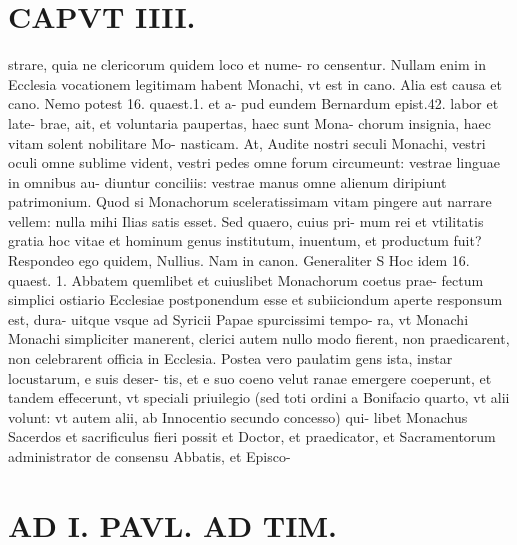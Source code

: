 \documentclass{article}
\begin{document}
\begin{pages}
\section*{CAPVT  IIII. }
\marginpar{[ p.223 ]}\pstart strare, quia ne clericorum quidem loco et nume- ro censentur. Nullam enim in Ecclesia vocationem legitimam habent Monachi, vt est in cano. Alia est causa et cano. Nemo potest 16. quaest.1. et a- pud eundem Bernardum epist.42. labor et late- brae, ait, et voluntaria paupertas, haec sunt Mona- chorum insignia, haec vitam solent nobilitare Mo- nasticam. At, Audite nostri seculi Monachi, vestri oculi omne sublime vident, vestri pedes omne forum circumeunt: vestrae linguae in omnibus au- diuntur conciliis: vestrae manus omne alienum diripiunt patrimonium. Quod si Monachorum sceleratissimam vitam pingere aut narrare vellem: nulla mihi Ilias satis esset. Sed quaero, cuius pri- mum rei et vtilitatis gratia hoc vitae et hominum genus institutum, inuentum, et productum fuit? Respondeo ego quidem, Nullius. Nam in canon. Generaliter S Hoc idem 16. quaest. 1. Abbatem quemlibet et cuiuslibet Monachorum coetus prae- fectum simplici ostiario Ecclesiae postponendum esse et subiiciondum aperte responsum est, dura- uitque vsque ad Syricii Papae spurcissimi tempo- ra, vt Monachi Monachi simpliciter manerent, clerici autem nullo modo fierent, non praedicarent, non celebrarent officia in Ecclesia. Postea vero paulatim gens ista, instar locustarum, e suis deser- tis, et e suo coeno velut ranae emergere coeperunt, et tandem effecerunt, vt speciali priuilegio (sed toti ordini a Bonifacio quarto, vt alii volunt: vt autem alii, ab Innocentio secundo concesso) qui- libet Monachus Sacerdos et sacrificulus fieri possit et Doctor, et praedicator, et Sacramentorum administrator de consensu Abbatis, et Episco-  \pend
\section*{AD I. PAVL. AD TIM. }
\marginpar{[ p.224 ]}\pstart {}
{}

\end{pages}
\end{document}
